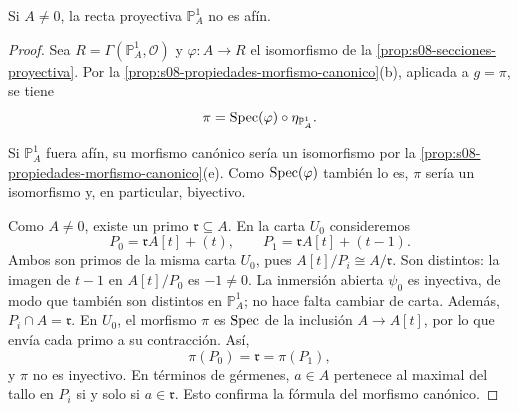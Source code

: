 \begin{coro}
\label{coro:s08-proyectiva-no-afin}
Si $A\ne0$, la recta proyectiva $\mathbb P_A^1$ no es afín.
\end{coro}
\begin{proof}
Sea $R=\Gamma(\mathbb P_A^1,\mathcal O)$ y $\varphi\colon A\to R$ el isomorfismo de la \cref{prop:s08-secciones-proyectiva}. Por la \cref{prop:s08-propiedades-morfismo-canonico}(b), aplicada a $g=\pi$, se tiene
\[
\pi=\operatorname{Spec}(\varphi)\circ\eta_{\mathbb P_A^1}.
\]
\begin{center}
\end{center}
Si $\mathbb P_A^1$ fuera afín, su morfismo canónico sería un isomorfismo por la \cref{prop:s08-propiedades-morfismo-canonico}(e). Como $\operatorname{Spec}(\varphi)$ también lo es, $\pi$ sería un isomorfismo y, en particular, biyectivo.

Como $A\ne0$, existe un primo $\mathfrak r\subseteq A$. En la carta $U_0$ consideremos
\[
P_0=\mathfrak r A[t]+(t),\qquad
P_1=\mathfrak r A[t]+(t-1).
\]
Ambos son primos de la misma carta $U_0$, pues $A[t]/P_i\cong A/\mathfrak r$. Son distintos: la imagen de $t-1$ en $A[t]/P_0$ es $-1\ne0$. La inmersión abierta $\psi_0$ es inyectiva, de modo que también son distintos en $\mathbb P_A^1$; no hace falta cambiar de carta. Además, $P_i\cap A=\mathfrak r$. En $U_0$, el morfismo $\pi$ es $\operatorname{Spec}$ de la inclusión $A\to A[t]$, por lo que envía cada primo a su contracción. Así,
\[
\pi(P_0)=\mathfrak r=\pi(P_1),
\]
y $\pi$ no es inyectivo. En términos de gérmenes, $a\in A$ pertenece al maximal del tallo en $P_i$ si y solo si $a\in\mathfrak r$. Esto confirma la fórmula del morfismo canónico.
\end{proof}


